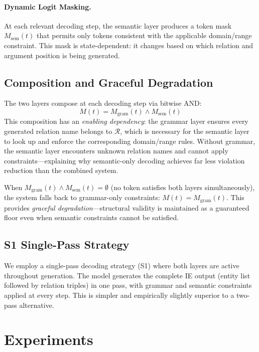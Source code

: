\documentclass[11pt,a4paper]{article}
\begin{document}
\paragraph{Dynamic Logit Masking.} At each relevant decoding step, the semantic layer produces a token mask $M_{\text{sem}}(t)$ that permits only tokens consistent with the applicable domain/range constraint. This mask is state-dependent: it changes based on which relation and argument position is being generated.

\subsection{Composition and Graceful Degradation}
\label{sec:composition}

The two layers compose at each decoding step via bitwise AND:
\begin{equation}
    M(t) = M_{\text{gram}}(t) \wedge M_{\text{sem}}(t)
\end{equation}
This composition has an \emph{enabling dependency}: the grammar layer ensures every generated relation name belongs to $\mathcal{R}$, which is necessary for the semantic layer to look up and enforce the corresponding domain/range rules. Without grammar, the semantic layer encounters unknown relation names and cannot apply constraints---explaining why semantic-only decoding achieves far less violation reduction than the combined system.

When $M_{\text{gram}}(t) \wedge M_{\text{sem}}(t) = \emptyset$ (no token satisfies both layers simultaneously), the system falls back to grammar-only constraints: $M(t) = M_{\text{gram}}(t)$. This provides \emph{graceful degradation}---structural validity is maintained as a guaranteed floor even when semantic constraints cannot be satisfied.

\subsection{S1 Single-Pass Strategy}

We employ a single-pass decoding strategy (S1) where both layers are active throughout generation. The model generates the complete IE output (entity list followed by relation triples) in one pass, with grammar and semantic constraints applied at every step. This is simpler and empirically slightly superior to a two-pass alternative.

\section{Experiments}
\label{sec:experiments}
\end{document}
